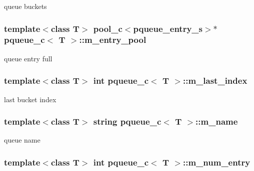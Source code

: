 \label{classpqueue__c_aea1aa5cd5b12ba0c04d8c61444533080}
queue buckets \hypertarget{classpqueue__c_a7799f021f9468af506ed33cdde50d54b}{
\subsubsection[{m\_\-entry\_\-pool}]{\setlength{\rightskip}{0pt plus 5cm}template$<$class T$>$ {\bf pool\_\-c}$<${\bf pqueue\_\-entry\_\-s}$>$$\ast$ {\bf pqueue\_\-c}$<$ T $>$::{\bf m\_\-entry\_\-pool}}}
\label{classpqueue__c_a7799f021f9468af506ed33cdde50d54b}
queue entry full \hypertarget{classpqueue__c_ac66baa49b33c1c773bd1e2575d814d95}{
\subsubsection[{m\_\-last\_\-index}]{\setlength{\rightskip}{0pt plus 5cm}template$<$class T$>$ int {\bf pqueue\_\-c}$<$ T $>$::{\bf m\_\-last\_\-index}}}
\label{classpqueue__c_ac66baa49b33c1c773bd1e2575d814d95}
last bucket index \hypertarget{classpqueue__c_ae8a7ef64df724a846fdd99e7662eb7b1}{
\subsubsection[{m\_\-name}]{\setlength{\rightskip}{0pt plus 5cm}template$<$class T$>$ string {\bf pqueue\_\-c}$<$ T $>$::{\bf m\_\-name}}}
\label{classpqueue__c_ae8a7ef64df724a846fdd99e7662eb7b1}
queue name \hypertarget{classpqueue__c_a933bd55083a228754eb47655616f0a6d}{
\subsubsection[{m\_\-num\_\-entry}]{\setlength{\rightskip}{0pt plus 5cm}template$<$class T$>$ int {\bf pqueue\_\-c}$<$ T $>$::{\bf m\_\-num\_\-entry}}}

